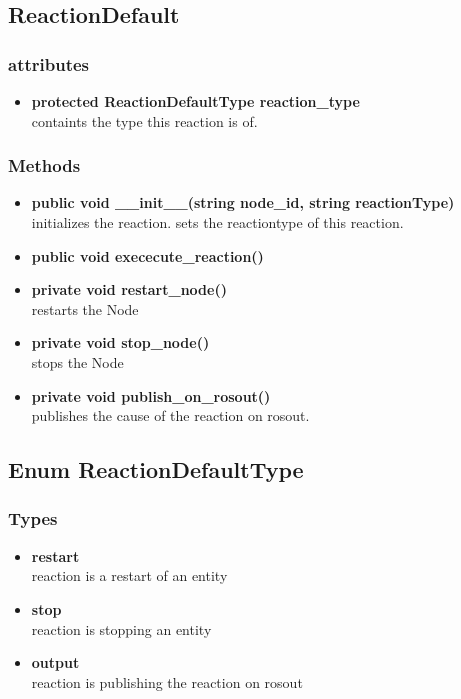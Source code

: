 \subsection{ReactionDefault}
\subsubsection{attributes}
\begin{itemize}
	\item \textbf{ protected ReactionDefaultType reaction\_type}\\
		containts the type this reaction is of.
\end{itemize}
\subsubsection{Methods}
\begin{itemize}
	\item \textbf{ public void \_\_init\_\_(string node\_id, string reactionType) }\\
		initializes the reaction. sets the reactiontype of this reaction.
	\item \textbf{ public void exececute\_reaction() }\\
	\item \textbf{ private void restart\_node() }\\
		restarts the Node
	\item \textbf{ private void stop\_node() }\\
		stops the Node
	\item \textbf{ private void publish\_on\_rosout() }\\
		publishes the cause of the reaction on rosout.
\end{itemize}


\subsection{Enum ReactionDefaultType}
\subsubsection{Types}
\begin{itemize}
	\item \textbf{ restart }\\
		reaction is a restart of an entity
	\item \textbf{ stop }\\
		reaction is stopping an entity
	\item \textbf{ output }\\
		reaction is publishing the reaction on rosout
\end{itemize}


